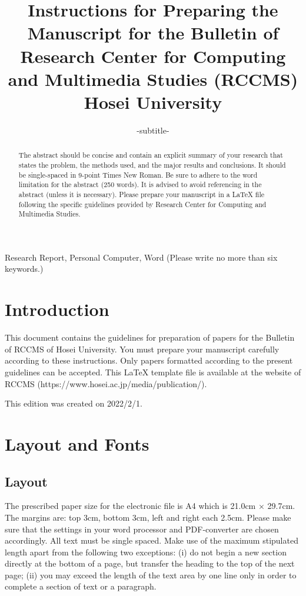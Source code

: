 \documentclass[english]{brccms-hu}
\begin{document}
\title{Instructions for Preparing the Manuscript for the Bulletin of\\ Research Center for Computing and Multimedia Studies (RCCMS)\\ Hosei University}
\subtitle{-subtitle-}


\begin{abstract}
The abstract should be concise and contain an explicit summary of your research that states the problem, the methods used, and the major results and conclusions. It should be single-spaced in 9-point Times New Roman. Be sure to adhere to the word limitation for the abstract (250 words). It is advised to avoid referencing in the abstract (unless it is necessary). Please prepare your manuscript in a \LaTeX{} file following the specific guidelines provided by Research Center for Computing and Multimedia Studies.
\end{abstract}
\begin{keyword}
Research Report, Personal Computer, Word (Please write no more than six keywords.)
\end{keyword}
\maketitle

\section{Introduction}
This document contains the guidelines for preparation of papers for the Bulletin of RCCMS of Hosei University. You must prepare your manuscript carefully according to these instructions. Only papers formatted according to the present guidelines can be accepted. This \LaTeX{} template file is available at the website of RCCMS (https://www.hosei.ac.jp/media/publication/).

This edition was created on 2022/2/1.
\section{Layout and Fonts}
\subsection{Layout}
The prescribed paper size for the electronic file is A4 which is 21.0cm $\times$ 29.7cm. The margins are: top 3cm, bottom 3cm, left and right each 2.5cm. Please make sure that the settings in your word processor and PDF-converter are chosen accordingly. All text must be single spaced. Make use of the maximum stipulated length apart from the following two exceptions: (i) do not begin a new section directly at the bottom of a page, but transfer the heading to the top of the next page; (ii) you may exceed the length of the text area by one line only in order to complete a section of text or a paragraph.
\end{document}
